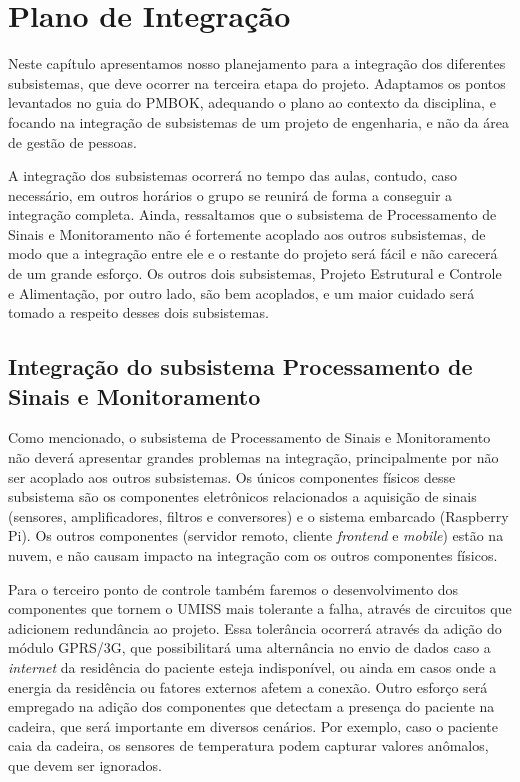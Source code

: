 \chapter{Plano de Integração}
\label{chapter:plano}

Neste capítulo apresentamos nosso planejamento para a integração dos diferentes
subsistemas, que deve ocorrer na terceira etapa do projeto. Adaptamos os pontos
levantados no guia do PMBOK, adequando o plano ao contexto da disciplina, e
focando na integração de subsistemas de um projeto de engenharia, e não da área
de gestão de pessoas.

A integração dos subsistemas ocorrerá no tempo das aulas, contudo, caso
necessário, em outros horários o grupo se reunirá de forma a conseguir a
integração completa. Ainda, ressaltamos que o subsistema de Processamento de
Sinais e Monitoramento não é fortemente acoplado aos outros subsistemas, de
modo que a integração entre ele e o restante do projeto será fácil e não
carecerá de um grande esforço. Os outros dois subsistemas, Projeto Estrutural
e Controle e Alimentação, por outro lado, são bem acoplados, e um maior cuidado
será tomado a respeito desses dois subsistemas.

\section{Integração do subsistema Processamento de Sinais e Monitoramento}

Como mencionado, o subsistema de Processamento de Sinais e Monitoramento não
deverá apresentar grandes problemas na integração, principalmente por não ser
acoplado aos outros subsistemas. Os únicos componentes físicos desse subsistema
são os componentes eletrônicos relacionados a aquisição de sinais (sensores,
amplificadores, filtros e conversores) e o sistema embarcado (Raspberry Pi).
Os outros componentes (servidor remoto, cliente \textit{frontend} e
\textit{mobile}) estão na nuvem, e não causam impacto na integração com os
outros componentes físicos.

Para o terceiro ponto de controle também faremos o desenvolvimento dos
componentes que tornem o UMISS mais tolerante a falha, através de circuitos
que adicionem redundância ao projeto. Essa tolerância ocorrerá através da
adição do módulo GPRS/3G, que possibilitará uma alternância no envio de dados
caso a \textit{internet} da residência do paciente esteja indisponível, ou
ainda em casos onde a energia da residência ou fatores externos afetem a
conexão. Outro esforço será empregado na
adição dos componentes que detectam a presença do paciente na cadeira, que
será importante em diversos cenários.  Por exemplo, caso o paciente caia da
cadeira, os sensores de temperatura podem capturar valores anômalos, que devem
ser ignorados.

